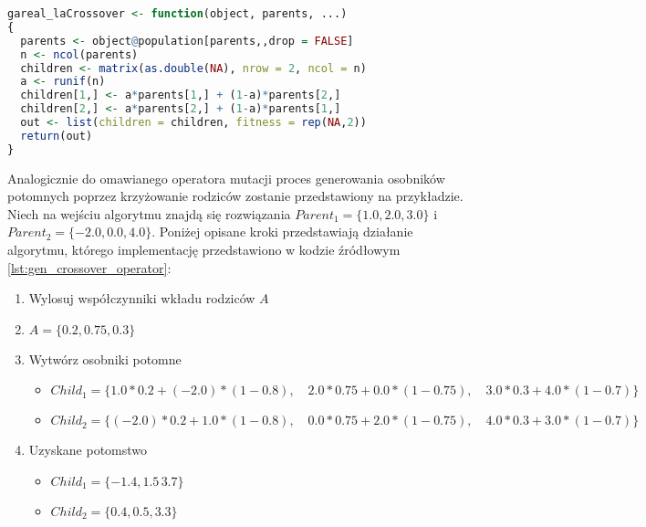 \begin{lstlisting}[caption=Zastosowany operator krzyżowania z pakietu \emph{GA} dla języka \emph{R}, label=lst:gen_crossover_operator, mathescape, breaklines=true, language=R]
gareal_laCrossover <- function(object, parents, ...)
{
  parents <- object@population[parents,,drop = FALSE]
  n <- ncol(parents)
  children <- matrix(as.double(NA), nrow = 2, ncol = n)
  a <- runif(n)
  children[1,] <- a*parents[1,] + (1-a)*parents[2,]
  children[2,] <- a*parents[2,] + (1-a)*parents[1,]
  out <- list(children = children, fitness = rep(NA,2))
  return(out)
}
\end{lstlisting}
Analogicznie do omawianego operatora mutacji proces generowania osobników potomnych poprzez krzyżowanie rodziców zostanie przedstawiony na przykładzie. Niech na wejściu algorytmu znajdą się rozwiązania $Parent_1 = \lbrace1.0, 2.0, 3.0\rbrace$ i $Parent_2 = \lbrace-2.0, 0.0, 4.0\rbrace$. Poniżej opisane kroki przedstawiają działanie algorytmu, którego implementację przedstawiono w kodzie źródłowym \ref{lst:gen_crossover_operator}:
\begin{enumerate}
\item Wylosuj współczynniki wkładu rodziców $A$
\item $A=\lbrace0.2, 0.75, 0.3\rbrace$
\item Wytwórz osobniki potomne
\begin{itemize}
\item $Child_1 = \lbrace1.0*0.2+(-2.0)*(1-0.8),\quad 2.0*0.75+0.0*(1-0.75),\quad 3.0*0.3+4.0*(1-0.7)\rbrace$
\item $Child_2 = \lbrace(-2.0)*0.2+1.0*(1-0.8),\quad 0.0*0.75+2.0*(1-0.75),\quad 4.0*0.3+3.0*(1-0.7)\rbrace$
\end{itemize}
\item Uzyskane potomstwo
\begin{itemize}
\item $Child_1 = \lbrace-1.4,1.5\, 3.7\rbrace$
\item $Child_2 = \lbrace0.4, 0.5, 3.3\rbrace$
\end{itemize}
\end{enumerate}

